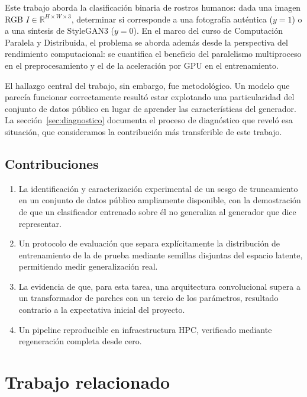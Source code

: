 \documentclass[10pt,twocolumn,letterpaper]{article}
\begin{document}
Este trabajo aborda la clasificación binaria de rostros humanos: dada una
imagen RGB $I \in \mathbb{R}^{H \times W \times 3}$, determinar si
corresponde a una fotografía auténtica ($y=1$) o a una síntesis de
StyleGAN3 ($y=0$). En el marco del curso de Computación Paralela y
Distribuida, el problema se aborda además desde la perspectiva del
rendimiento computacional: se cuantifica el beneficio del paralelismo
multiproceso en el preprocesamiento y el de la aceleración por GPU en el
entrenamiento.

El hallazgo central del trabajo, sin embargo, fue metodológico. Un modelo
que parecía funcionar correctamente resultó estar explotando una
particularidad del conjunto de datos público en lugar de aprender las
características del generador. La sección~\ref{sec:diagnostico} documenta el
proceso de diagnóstico que reveló esa situación, que consideramos la
contribución más transferible de este trabajo.

\subsection{Contribuciones}

\begin{enumerate}\itemsep0.15em
\item La identificación y caracterización experimental de un sesgo de
truncamiento en un conjunto de datos público ampliamente disponible, con la
demostración de que un clasificador entrenado sobre él no generaliza al
generador que dice representar.
\item Un protocolo de evaluación que separa explícitamente la distribución de
entrenamiento de la de prueba mediante semillas disjuntas del espacio
latente, permitiendo medir generalización real.
\item La evidencia de que, para esta tarea, una arquitectura convolucional
supera a un transformador de parches con un tercio de los parámetros,
resultado contrario a la expectativa inicial del proyecto.
\item Un pipeline reproducible en infraestructura HPC, verificado mediante
regeneración completa desde cero.
\end{enumerate}

\section{Trabajo relacionado}
\end{document}
